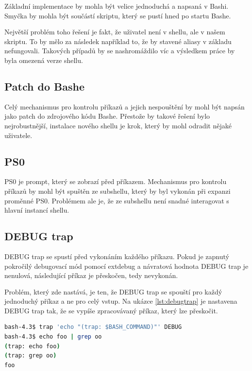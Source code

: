 \documentclass[thesis=M,czech]{FITthesis}[2012/06/26]
\begin{document}
Základní implementace by mohla být velice jednoduchá a napsaná v Bashi. Smyčka by mohla být součástí skriptu, který se pustí hned po startu Bashe.

Největší problém toho řešení je fakt, že uživatel není v shellu, ale v našem skriptu. To by mělo za následek například to, že by stavené aliasy v základu nefungovali. Takových případů by se nashromáždilo víc a výsledkem práce by byla omezená verze shellu.


%
%
\subsection{Patch do Bashe}

Celý mechanismus pro kontrolu příkazů a jejich nespouštění by mohl být napsán jako patch do zdrojového kódu Bashe. Přestože by takové řešení bylo nejrobustnější, instalace nového shellu je krok, který by mohl odradit nějaké uživatele.

%
\subsection{PS0}

PS0 je prompt, který se zobrazí před  příkazem. Mechanismus pro kontrolu příkazů by mohl být spuštěn ze subshellu, který by byl vykonán při expanzi proměnné PS0. Problémem ale je, že ze subshellu není snadné interagovat s hlavní instancí shellu.

%
%
\subsection{DEBUG trap}

DEBUG trap se spustí před vykonáním každého příkazu. Pokud je zapnutý pokročilý debugovací mód pomocí extdebug a návratová hodnota DEBUG trap je nenulová, následující příkaz je přeskočen, tedy nevykonán.

Problém, který zde nastává, je ten, že DEBUG trap se spouští pro každý jednoduchý příkaz a ne pro celý vstup. Na ukázce \ref{lst:debugtrap} je nastavena DEBUG trap tak, že se vypíše zpracovávaný příkaz, který lze přeskočit.

\begin{lstlisting}[language=bash, caption={DEBUG trap}, label={lst:debugtrap}]
bash-4.3$ trap 'echo "(trap: $BASH_COMMAND)"' DEBUG
bash-4.3$ echo foo | grep oo
(trap: echo foo)
(trap: grep oo)
foo
\end{lstlisting}
\end{document}
